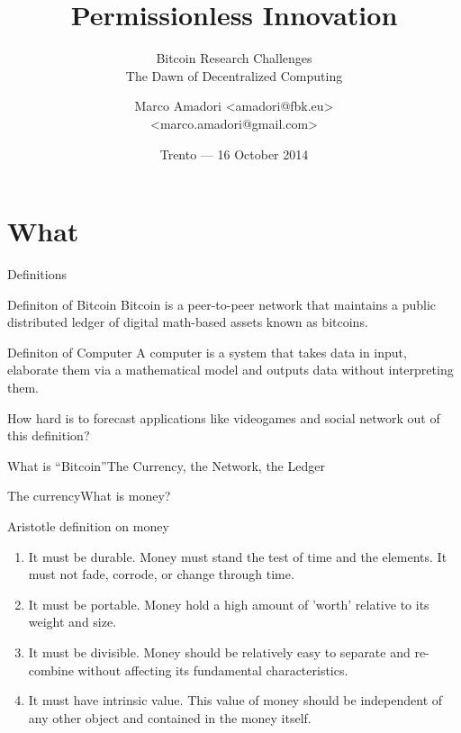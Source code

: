 \documentclass[english,compress]{beamer}
\title[Bitcoin Research Challenges]{Permissionless Innovation}
\subtitle{Bitcoin Research Challenges \\ The Dawn of Decentralized Computing}
\author[Marco Amadori]{Marco Amadori <amadori@fbk.eu> \\ <marco.amadori@gmail.com>}
\institute{Fondazione Bruno Kessler --- \url{https://www.fbk.eu}}
\date{\scriptsize Trento --- \vspace{.10cm}16 October 2014}
\begin{document}
\begin{frame}[plain]
  \titlepage
  \begin{center}%
    \hspace{1cm}%
    \end{center}%
\end{frame}


\section{What}

\begin{frame}[<+->]{Definitions}

\begin{exampleblock}{Definiton of Bitcoin}
Bitcoin is a peer-to-peer network
that maintains a public distributed ledger of 
digital math-based assets known as bitcoins.
\end{exampleblock}

\begin{exampleblock}{Definiton of Computer}
A computer is a system that takes data in input, elaborate them via a mathematical model and outputs data without interpreting them.
\end{exampleblock}

\onslide<+-> How hard is to forecast applications like videogames and social network out of this definition?


\end{frame}

\begin{frame}{What is ``Bitcoin''}{The Currency, the Network, the Ledger}
\begin{center}
\end{center}
\end{frame}

\begin{frame}{The currency}{What is money?}
\begin{exampleblock}{Aristotle definition on money}
\begin{enumerate}
 \item It must be durable. Money must stand the test of time
 and the elements. It must not fade, corrode, or change through time.
 \item It must be portable. Money hold a high amount of 'worth' relative to its weight and size.
 \item It must be divisible. Money should be relatively easy to separate
 and re-combine without affecting its fundamental characteristics.
 \item It must have intrinsic value. This value of money should be independent 
 of any other object and contained in the money itself.
\end{enumerate}
\end{exampleblock}
\end{frame}
\end{document}
